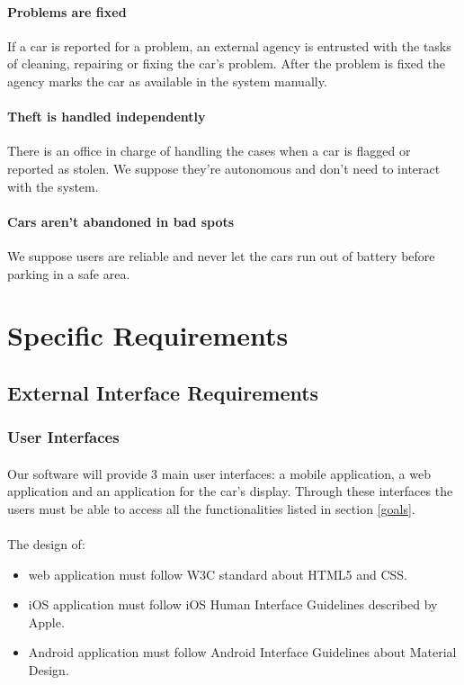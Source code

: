 \documentclass[english]{article}
\begin{document}
\begin{itemize}
\paragraph{Problems are fixed}
If a car is reported for a problem, an external agency is entrusted with the tasks of cleaning, repairing or fixing the car's problem. After the problem is fixed the agency marks the car as available in the system manually.

\paragraph{Theft is handled independently}
There is an office in charge of handling the cases when a car is flagged or reported as stolen.
We suppose they're autonomous and don't need to interact with the system.

\paragraph{Cars aren't abandoned in bad spots}
We suppose users are reliable and never let the cars run out of battery before parking in a safe area.

\newpage

\section{Specific Requirements}

\subsection{External Interface Requirements}

\subsubsection{User Interfaces}

\paragraph{}
Our software will provide 3 main user interfaces: a mobile application, a web application and an application for the car's display.
Through these interfaces the users must be able to access all the functionalities listed in section \ref{goals}.

\paragraph{}
The design of:
\begin{itemize}
  \item{web application must follow W3C standard about HTML5 and CSS.}
  \item{iOS application must follow iOS Human Interface Guidelines described by Apple.}
  \item{Android application must follow Android Interface Guidelines about Material Design.}
\end{itemize}


\end{itemize}
\end{document}
